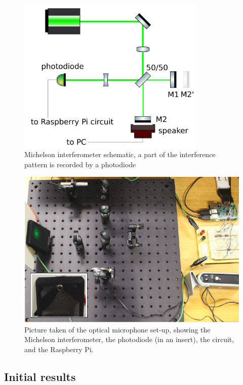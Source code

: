 \documentclass[prb,preprint]{revtex4-1}
\begin{document}
\begin{figure}
	\includegraphics[width=0.8\textwidth]{figures/ifo_schematic_photodiode.pdf}
	\caption{Michelson interferometer schematic, a part of the interference pattern is recorded by a photodiode}
	\label{fig:ifo_schematic_podo}
\end{figure}

\begin{figure}
	\includegraphics[width=\textwidth]{figures/setup_pic2.pdf}
	\caption{Picture taken of the optical microphone set-up, showing the Michelson interferometer, the photodiode (in an insert), the circuit, and the Raspberry Pi.}
	\label{fig:setup_pic2}
\end{figure}

\subsection{Initial results}
\end{document}
